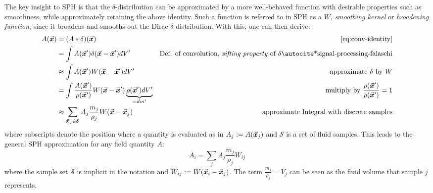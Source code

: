 The key insight to SPH is that the $\delta$-distribution can be approximated by a more well-behaved function with desirable properties such as smoothness, while approximately retaining the above identity. Such a function is referred to in SPH as a  $W$, \textit{smoothing kernel}\autocite*{tutorial} or \textit{broadening function}\autocite*{sph-lucy-77}, since it broadens and smooths out the Dirac-$\delta$ distribution. With this, one can then derive\autocite*{tutorial}:
\begin{align}
  A(\vek{x}) & = (A * \delta)(\vek{x})                                                                             & \text{\autoref{eq:conv-identity}}                                                                       \\
             & = \int A(\vek{x}') \delta(\vek{x}-\vek{x}') dV'                                                     & \text{Def. of convolution, \textit{sifting property} of $\delta$\autocite*{signal-processing-falaschi}} \\                                                             \label{eq:sph-derivation-kernel-approx}
             & \approx \int A(\vek{x}') W(\vek{x}-\vek{x}') dV'                                                    & \text{approximate $\delta$ by $W$}                                                                      \\
             & = \int \frac{A(\vek{x}')}{\rho(\vek{x}')} W(\vek{x}-\vek{x}') \underbrace{\rho(\vek{x}')dV'}_{=dm'} & \text{multiply by $\frac{\rho(\vek{x}')}{\rho(\vek{x}')}=1$}                                            \\\label{eq:sph-derivation-sum-approx}
             & \approx \sum_{\vek{x}_j\in\mathcal{S}} A_j \frac{m_j}{\rho_j} W(\vek{x}-\vek{x}_j)                  & \text{approximate Integral with discrete samples}
\end{align}
where subscripts denote the position where a quantity is evaluated as in $A_j := A(\vec{\bm{x}}_j)$ and $\mathcal{S}$ is a set of fluid samples. This leads to the general SPH approximation for any field quantity\autocite*{tutorial} $A$:
\begin{equation}\label{eq:sph-any-quantity}
  A_i = \sum_j A_j \frac{m_j}{\rho_j} W_{ij}
\end{equation}
where the sample set $\mathcal{S}$ is implicit in the notation and $W_{ij} := W(\vec{\bm{x}}_i-\vec{\bm{x}}_j)$. The term $\frac{m_j}{\rho_j} = V_j$ can be seen as the fluid volume that sample $j$ represents.

